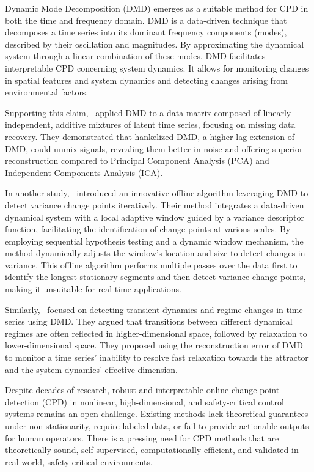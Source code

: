 Dynamic Mode Decomposition (DMD) emerges as a suitable method for CPD in both the time and frequency domain. DMD is a data-driven technique that decomposes a time series into its dominant frequency components (modes), described by their oscillation and magnitudes. By approximating the dynamical system through a linear combination of these modes, DMD facilitates interpretable CPD concerning system dynamics. It allows for monitoring changes in spatial features and system dynamics and detecting changes arising from environmental factors.

Supporting this claim,~\cite{Prasadan2020} applied DMD to a data matrix composed of linearly independent, additive mixtures of latent time series, focusing on missing data recovery. They demonstrated that hankelized DMD, a higher-lag extension of DMD, could unmix signals, revealing them better in noise and offering superior reconstruction compared to Principal Component Analysis (PCA) and Independent Components Analysis (ICA).

In another study,~\cite{Srivastava2017} introduced an innovative offline algorithm leveraging DMD to detect variance change points iteratively. Their method integrates a data-driven dynamical system with a local adaptive window guided by a variance descriptor function, facilitating the identification of change points at various scales. By employing sequential hypothesis testing and a dynamic window mechanism, the method dynamically adjusts the window's location and size to detect changes in variance. This offline algorithm performs multiple passes over the data first to identify the longest stationary segments and then detect variance change points, making it unsuitable for real-time applications.

Similarly,~\cite{Gottwald2020} focused on detecting transient dynamics and regime changes in time series using DMD\@. They argued that transitions between different dynamical regimes are often reflected in higher-dimensional space, followed by relaxation to lower-dimensional space. They proposed using the reconstruction error of DMD to monitor a time series' inability to resolve fast relaxation towards the attractor and the system dynamics' effective dimension.

Despite decades of research, robust and interpretable online change-point detection (CPD) in nonlinear, high-dimensional, and safety-critical control systems remains an open challenge. Existing methods lack theoretical guarantees under non-stationarity, require labeled data, or fail to provide actionable outputs for human operators. There is a pressing need for CPD methods that are theoretically sound, self-supervised, computationally efficient, and validated in real-world, safety-critical environments.

